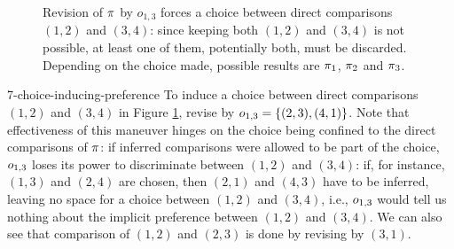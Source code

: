 \begin{figure}\centering
	\caption{
		Revision of $\pi$ by $o_{1,3}$ forces a choice between direct comparisons
		$(1,2)$ and $(3,4)$: since keeping both $(1,2)$ and $(3,4)$ is not possible, 
		at least one of them, potentially both, must be discarded.
		Depending on the choice made, possible results are $\pi_1$, $\pi_2$ and $\pi_3$.
	}
	\label{fig:7-choice-inducing-preference}
\end{figure}

\begin{xmpl}{}{7-choice-inducing-preference}
	To induce a choice between direct comparisons 
	$(1,2)$ and $(3,4)$ in Figure \ref{fig:7-choice-inducing-preference}, revise by 
	$o_{1,3}=\{(2,3),(4,1)\}$.
	Note that effectiveness of this maneuver hinges on the choice 
	being confined to the direct comparisons of $\pi$:
	if inferred comparisons were allowed to be part of the choice, 
	$o_{1,3}$ loses its power to discriminate between $(1,2)$ and $(3,4)$:
	if, for instance, $(1,3)$ and $(2,4)$ are chosen, then $(2,1)$ and $(4,3)$ 
	have to be inferred, leaving no space for a choice between $(1,2)$ and $(3,4)$,
	i.e., $o_{1,3}$ would tell us nothing about the implicit preference between $(1,2)$ and $(3,4)$.
	We can also see that comparison of $(1,2)$ and $(2,3)$ is done by revising by $(3,1)$.	
\end{xmpl}

